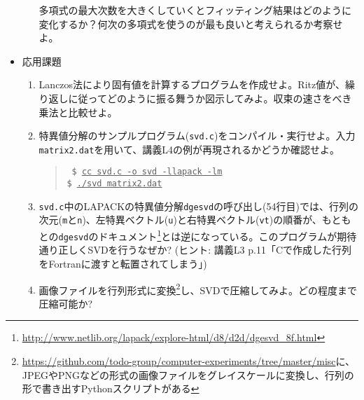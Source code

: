 \documentclass[11pt]{jarticle}
\begin{document}
\begin{itemize}
\begin{enumerate}
    多項式の最大次数を大きくしていくとフィッティング結果はどのように変化するか？何次の多項式を使うのが最も良いと考えられるか考察せよ。
  \end{enumerate}  
\item 応用課題
  \begin{enumerate}
  \item Lanczos法により固有値を計算するプログラムを作成せよ。Ritz値が、繰り返しに従ってどのように振る舞うか図示してみよ。収束の速さをべき乗法と比較せよ。
  \item 特異値分解のサンプルプログラム({\tt svd.c})をコンパイル・実行せよ。入力{\tt matrix2.dat}を用いて、講義L4の例が再現されるかどうか確認せよ。
    \begin{quote} \tt
      \$ \underline{cc svd.c -o svd -llapack -lm} \\
      \$ \underline{./svd matrix2.dat}
    \end{quote}
  \item {\tt svd.c}中のLAPACKの特異値分解{\tt dgesvd}の呼び出し(54行目)では、行列の次元({\tt m}と{\tt n})、左特異ベクトル({\tt u})と右特異ベクトル({\tt vt})の順番が、もともとの{\tt dgesvd}のドキュメント\footnote{\url{http://www.netlib.org/lapack/explore-html/d8/d2d/dgesvd_8f.html}}とは逆になっている。このプログラムが期待通り正しくSVDを行うなぜか? (ヒント: 講義L3 p.11「Cで作成した行列をFortranに渡すと転置されてしまう」)
  \item 画像ファイルを行列形式に変換\footnote{\url{https://github.com/todo-group/computer-experiments/tree/master/misc}に、JPEGやPNGなどの形式の画像ファイルをグレイスケールに変換し、行列の形で書き出すPythonスクリプトがある}し、SVDで圧縮してみよ。どの程度まで圧縮可能か?
  \end{enumerate}  
\end{itemize}
\end{document}

